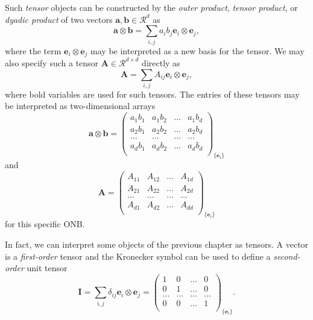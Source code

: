 Such \emph{tensor} objects can be constructed by the \emph{outer product}, \emph{tensor product}, or \emph{dyadic product} of two vectors $\mathbf{a}, \mathbf{b} \in \mathcal{R}^d$ as 
\begin{equation}
    \label{eq:tensorproduct}
    \mathbf{a} \otimes \mathbf{b} = \sum_{i,j} a_i b_j \mathbf{e}_i \otimes \mathbf{e}_j,
\end{equation}
where the term $\mathbf{e}_i \otimes \mathbf{e}_j$ may be interpreted as a new basis for the tensor. We may also specify such a tensor $\mathbf{A} \in \mathcal{R}^{d \times d}$ directly as 
\begin{equation}
    \mathbf{A} = \sum_{i,j} A_{ij} \mathbf{e}_i \otimes \mathbf{e}_j ,
\end{equation}
where bold variables are used for such tensors.
The entries of these tensors may be interpreted as two-dimensional arrays
\begin{equation}
    \mathbf{a} \otimes \mathbf{b} =
    \begin{pmatrix}
         a_1 b_1    & a_1 b_2   & \dots   & a_1 b_d  \\
         a_2 b_1    & a_2 b_2   & \dots   & a_2 b_d  \\
         \dots      & \dots     & \dots   & \dots  \\
         a_d b_1    & a_d b_2   & \dots   & a_d b_d  \\
    \end{pmatrix}_{\{\mathbf{e}_i\}}
\end{equation}
and 
\begin{equation}
    \mathbf{A} =
    \begin{pmatrix}
         A_{11}    & A_{12}   & \dots   & A_{1d}  \\
         A_{21}    & A_{22}   & \dots   & A_{2d}  \\
         \dots      & \dots     & \dots   & \dots  \\
         A_{d1}    & A_{d2}   & \dots   & A_{dd}  \\
    \end{pmatrix}_{\{\mathbf{e}_i\}}
\end{equation}
for this specific ONB.

In fact, we can interpret some objects of the previous chapter as tensors. A vector is a \emph{first-order} tensor and the Kronecker symbol can be used to define a \emph{second-order} unit tensor 
\begin{equation}
    \pmb{I} = \sum_{i,j} \delta_{ij} \mathbf{e}_i \otimes \mathbf{e}_j = 
    \begin{pmatrix}
         1      & 0     & \dots & 0 \\
         0      & 1     & \dots & 0 \\
         \dots  & \dots & \dots & \dots  \\
         0      & 0     & \dots & 1  \\
    \end{pmatrix}_{\{\mathbf{e}_i\}}.
\end{equation}

